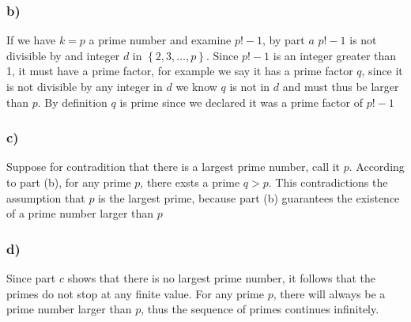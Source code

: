 \documentclass{article}
\begin{document}
\subsubsection*{b)}
If we have $k=p$ a prime number and examine $p!-1$, by part $a$ $p!-1$ is not divisible by and integer $d$ in $\left\{ 2,3,\dots,p \right\} $.
Since $p!-1$ is an integer greater than 1, it must have a prime factor, for example we say it has a prime factor $q$, since it is not divisible by any integer
in $d$ we know $q$ is not in $d$ and must thus be larger than $p$. By definition $q$ is prime since we declared it was a prime factor of $p!-1$

\subsubsection*{c)}
Suppose for contradition that there is a largest prime number, call it $p$. According to part (b), for any prime $p$, there exsts a prime $q>p$. This contradictions the assumption
that $p$ is the largest prime, because part (b) guarantees the existence of a prime number larger than $p$

\subsubsection*{d)}
Since part $c$ shows that there is no largest prime number, it follows that the primes do not stop at any finite value. For any prime $p$, there will always be a prime
number larger than $p$, thus the sequence of primes continues infinitely. 
\end{document}
